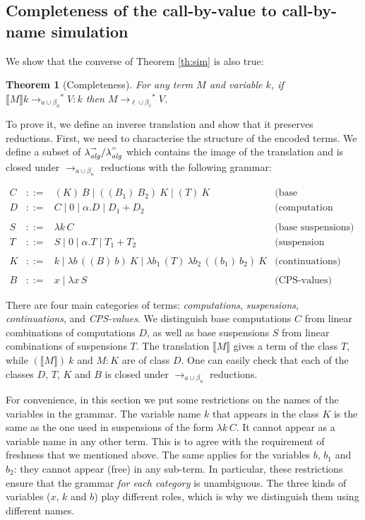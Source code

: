 \documentclass{LMCS}
\newtheorem{theorem}{Theorem}[section]
\newcommand{\xlalg}[1]{\ensuremath{\lambda^{\raisebox{0.5ex}{\textrm{\tiny $#1$}}}_{{\it alg}}}}
\newcommand{\lalgred}{\xlalg{\rightarrow}}
\newcommand{\lalgeq}{\xlalg{=}}
\newcommand{\xto}[1]{\ensuremath{\rightarrow_{#1}}}
\newcommand{\tobalgred}{\xto{a\cup\beta_n}}
\newcommand{\stoblinred}{\ensuremath{\xto{\ell\cup\beta_v}^{\ast}}}
\newcommand{\stobalgred}{\ensuremath{\xto{a\cup\beta_n}^{\ast}}}
\newcommand{\wt}[1]{\llbracket{#1}\rrbracket}
\begin{document}
\subsection{Completeness of the call-by-value to call-by-name simulation}\label{subsec:lintoalg-completeness}

We show that the converse of Theorem \ref{th:sim} is also true:
\begin{theorem}[Completeness]
  \label{thm:completeness} For any term $M$ and variable $k$, if $\wt Mk\stobalgred V:k$ then $M\stoblinred V$.
\end{theorem}
To prove it, we define an inverse translation and show that it preserves
reductions. First, we need to characterise the structure of
the encoded terms. We define a subset of $\lalgred/\lalgeq$ which contains
the image of the translation and is closed under $\tobalgred$ reductions
with the following grammar:

\[
  \begin{array}{rcll}
    C & ::= & (K)~B \mid ((B_{1})~B_{2})~K \mid (T)~K & \mbox{(base computations)}\\
    D & ::= & C\mid0\mid\alpha.D\mid D_{1}+D_{2} & \mbox{(computation combinations)}\\
    \\
    S & ::= & \lambda k\,C & \mbox{(base suspensions)}\\
    T & ::= & S\mid0\mid\alpha.T\mid T_{1}+T_{2} & \mbox{(suspension combinations)}\\
    \\
    K & ::= & k \mid \lambda b\,((B)~b)~K \mid \lambda{b_{1}}\,(T)~\lambda{b_{2}}\,((b_{1})~b_{2})~K & \mbox{(continuations)}\\
    \\
    B & ::= & x \mid \lambda x\,S & \mbox{(CPS-values)}
  \end{array}
\]


There are four main categories of terms: \emph{computations}, \emph{suspensions},
\emph{continuations}, and \emph{CPS-values}. We distinguish base computations
$C$ from linear combinations of computations $D$, as well as base
suspensions $S$ from linear combinations of suspensions $T$. The
translation $\wt M$ gives a term of the class $T$, while
$(\wt M)~k$ and $M:K$ are of class $D$. One can easily check
that each of the classes $D$, $T$, $K$ and $B$ is closed under $\tobalgred$
reductions.

For convenience, in this section we put some restrictions on the names of the variables in the
grammar. The variable name $k$ that appears in the class $K$ is the same as the one used in suspensions of the form $\lambda k\,C$.
It cannot appear as a variable name in any other term. This is to
agree with the requirement of freshness that we mentioned above. The
same applies for the variables $b$, $b_{1}$ and $b_{2}$: they cannot
appear (free) in any sub-term. In particular, these restrictions ensure
that the grammar \emph{for each category} is unambiguous. The three kinds
of variables ($x$, $k$ and $b$) play different roles, which is
why we distinguish them using different names.
\end{document}
